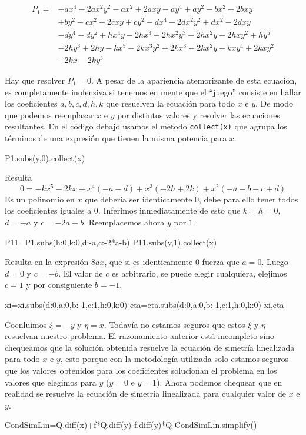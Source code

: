 \[
\begin{split}
P_1 =&- a x^{4} - 2 a x^{2} y^{2} - a x^{2} + 2 a x y - a y^{4} + a y^{2} - b x^{2} - 2 b x y\\
&+ b y^{2} - c x^{2} - 2 c x y+ c y^{2} - d x^{4} - 2 d x^{2} y^{2}
+ d x^{2} - 2 d x y\\
&- d y^{4} - d y^{2} + h x^{4} y - 2 h x^{3} + 2 h x^{2} y^{3} - 2 h x^{2} y - 2 h x y^{2} + h y^{5}\\
&- 2 h y^{3} + 2 h y - k x^{5} - 2 k x^{3} y^{2} + 2 k x^{3} - 2 k x^{2} y - k x y^{4} + 2 k x y^{2}\\
&- 2 k x - 2 k y^{3}
\end{split}
\]

Hay que resolver $P_1=0$. A pesar de la apariencia atemorizante de esta ecuación, es completamente inofensiva si tenemos en mente que el ``juego'' consiste en hallar los coeficientes $a,b,c,d,h,k$ que resuelven la ecuación para todo $x$ e $y$. De modo que podemos reemplazar $x$ e $y$ por distintos valores y resolver las ecuaciones resultantes. En el código debajo usamos el método \texttt{collect(x)} que agrupa los términos de una expresión que tienen la misma potencia para $x$.

\begin{sympyblock}[][frame=single]
P1.subs(y,0).collect(x)
\end{sympyblock}
Resulta
\[
 0=- k x^{5} - 2 k x + x^{4} (- a - d) + x^{3} (- 2 h + 2 k) + x^{2} (- a - b - c + d)
\]
Es un polinomio en $x$ que debería ser identicamente $0$, debe para ello tener todos los coeficientes iguales a $0$. Inferimos  inmediatamente de esto que $k=h=0$, $d=-a$ y $c=-2a-b$. Reemplacemos ahora $y$ por $1$.  

\begin{sympyblock}[][frame=single]
P11=P1.subs({h:0,k:0,d:-a,c:-2*a-b})
P11.subs(y,1).collect(x)
\end{sympyblock}
Resulta en la expresión $8ax$,  que si es identicamente $0$ fuerza  que $a=0$. Luego $d=0$ y $c=-b$. El valor de $c$ es arbitrario, se puede elegir cualquiera, elejimos $c=1$ y por consiguiente $b=-1$.   
 
 \begin{sympyblock}[][frame=single]
xi=xi.subs({d:0,a:0,b:-1,c:1,h:0,k:0})
eta=eta.subs({d:0,a:0,b:-1,c:1,h:0,k:0})
xi,eta
\end{sympyblock}
Cocnluímos $\xi=-y$ y $\eta=x$. Todavía no estamos seguros que estos $\xi$ y $\eta$ resuelvan nuestro problema. El razonamiento anterior está incompleto sino chequeamos que la solución obtenida resuelve la ecuación de simetría linealizada para todo $x$ e $y$, esto porque con la metodología  utilizada solo estamos seguros que los valores obtenidos para los coeficientes   solucionan el problema en los valores que elegimos para $y$ ($y=0$ e $y=1$). Ahora podemos chequear que en realidad se resuelve la ecuación de simetría linealizada para cualquier valor de $x$ e $y$.  
 \begin{sympyblock}[][frame=single]
CondSimLin=Q.diff(x)+f*Q.diff(y)-f.diff(y)*Q
CondSimLin.simplify()
\end{sympyblock}


